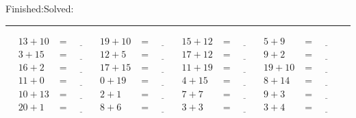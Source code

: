 \documentclass{article}
\begin{document}
\begin{sloppy}
\begin{center}
{\selectfont {Started:}\underline{\hspace{1.5cm}}{Finished:}\underline{\hspace{1.5cm}}{Solved:}\underline{\hspace{1.5cm}}}
\end{center}
\hrule
\begin{align*}
    {13} + {10} &= \underline{\hspace{1cm}} & {19} + {10} &= \underline{\hspace{1cm}} & {15} + {12} &= \underline{\hspace{1cm}} & {5} + {9} &= \underline{\hspace{1cm}} \\
    {3} + {15} &= \underline{\hspace{1cm}} & {12} + {5} &= \underline{\hspace{1cm}} & {17} + {12} &= \underline{\hspace{1cm}} & {9} + {2} &= \underline{\hspace{1cm}} \\
    {16} + {2} &= \underline{\hspace{1cm}} & {17} + {15} &= \underline{\hspace{1cm}} & {11} + {19} &= \underline{\hspace{1cm}} & {19} + {10} &= \underline{\hspace{1cm}} \\
    {11} + {0} &= \underline{\hspace{1cm}} & {0} + {19} &= \underline{\hspace{1cm}} & {4} + {15} &= \underline{\hspace{1cm}} & {8} + {14} &= \underline{\hspace{1cm}} \\
    {10} + {13} &= \underline{\hspace{1cm}} & {2} + {1} &= \underline{\hspace{1cm}} & {7} + {7} &= \underline{\hspace{1cm}} & {9} + {3} &= \underline{\hspace{1cm}} \\
    {20} + {1} &= \underline{\hspace{1cm}} & {8} + {6} &= \underline{\hspace{1cm}} & {3} + {3} &= \underline{\hspace{1cm}} & {3} + {4} &= \underline{\hspace{1cm}} \\

\end{align*}
\end{sloppy}
\end{document}
